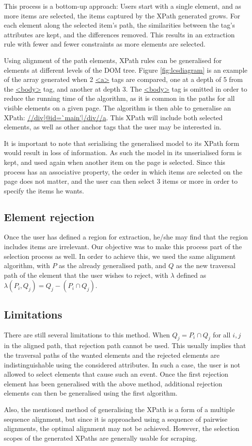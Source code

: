 This process is a bottom-up approach: Users start with a single element, and as more items are selected, the items captured by the XPath generated grows. For each element along the selected item's path, the similarities between the tag's attributes are kept, and the differences removed. This results in an extraction rule with fewer and fewer constraints as more elements are selected.



Using alignment of the path elements, XPath rules can be generalised for elements at different levels of the DOM tree. Figure \ref{fig:lcsdiagram} is an example of the array generated when 2 \url{<a>} tags are compared, one at a depth of 5 from the \url{<body>} tag, and another at depth 3. The \url{<body>} tag is omitted in order to reduce the running time of the algorithm, as it is common in the paths for all visible elements on a given page. The algorithm is then able to generalise an XPath: \url{//div[@id=`main']/div//a}. This XPath will include both selected elements, as well as other anchor tags that the user may be interested in.




It is important to note that serialising the generalised model to its XPath form would result in loss of information. As such the model in its unserialised form is kept, and used again when another item on the page is selected. Since this process has an associative property, the order in which items are selected on the page does not matter, and the user can then select 3 items or more in order to specify the items he wants.

\subsection{Element rejection}

Once the user has defined a region for extraction, he/she may find that the region includes items are irrelevant. Our objective was to make this process part of the selection process as well. In order to achieve this, we used the same alignment algorithm, with $P$ as the already generalised path, and $Q$ as the new traversal path of the element that the user wishes to reject, with $\lambda$ defined as $\lambda(P_i,Q_j) = Q_j - (P_i \cap Q_j)$.


\subsection{Limitations}
There are still several limitations to this method. When $Q_j = P_i \cap Q_j$ for all $i,j$ in the aligned path, that rejection path cannot be used. This usually implies that the traversal paths of the wanted elements and the rejected elements are indistinguishable using the considered attributes. In such a case, the user is not allowed to select elements that cause such an event. Once the first rejection element has been generalised with the above method, additional rejection elements can then be generalised using the first algorithm.

Also, the mentioned method of generalising the XPath is a form of a multiple sequence alignment, but since it is approached using a sequence of pairwise alignments, the optimal alignment may not be achieved. However, the selection scopes of the generated XPaths are generally usable for scraping.


